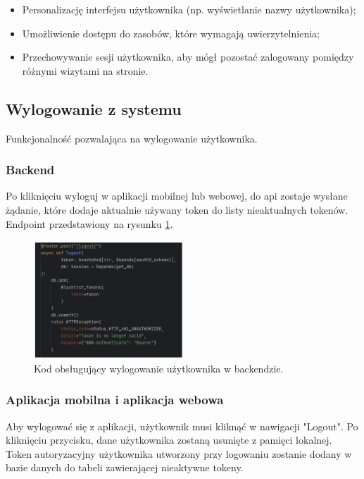\begin{itemize}
    \item Personalizację interfejsu użytkownika (np. wyświetlanie nazwy użytkownika);
    \item Umożliwienie dostępu do zasobów, które wymagają uwierzytelnienia;
    \item Przechowywanie sesji użytkownika, aby mógł pozostać zalogowany pomiędzy różnymi wizytami na stronie.
\end{itemize}

\subsection{Wylogowanie z systemu}
Funkcjonalność pozwalająca na wylogowanie użytkownika.

\subsubsection{Backend}
Po kliknięciu wyloguj w aplikacji mobilnej lub webowej, do api zostaje wysłane żądanie, które dodaje aktualnie używany token do listy nieaktualnych tokenów. Endpoint przedstawiony na rysunku \ref{img:wylogowanie_backend}.

\begin{figure}[H]
    \centering
    \includegraphics[width=0.5\textwidth]{chapters/chapter_8/screens/wylogowanie_backend}
    \caption{Kod obsługujący wylogowanie użytkownika w backendzie.}
    \label{img:wylogowanie_backend}
\end{figure}

\subsubsection{Aplikacja mobilna i aplikacja webowa}
Aby wylogować się z aplikacji, użytkownik musi kliknąć w nawigacji "Logout". Po kliknięciu przycisku, dane użytkownika zostaną usunięte z pamięci lokalnej. Token autoryzacyjny użytkownika utworzony przy logowaniu zostanie dodany w bazie danych do tabeli zawierającej nieaktywne tokeny.

